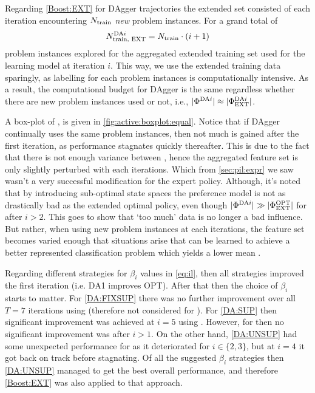 Regarding \ref{Boost:EXT} for DAgger trajectories the extended set 
consisted of each iteration encountering $N_{\text{train}}$ \emph{new} problem 
instances. For a grand total of 
\begin{equation}
N^{\text{DA}i}_{\text{train, EXT}}=N_{\text{train}}\cdot (i+1) 
\end{equation}
problem instances explored for the aggregated extended training set used for 
the learning model at iteration $i$.
This way, we use the extended training data sparingly, as labelling for each 
problem instances is computationally intensive. As a result, the computational 
budget for DAgger is the same regardless whether there are new problem 
instances used or not, i.e., 
$\lvert\Phi^{\text{DA}i}\rvert\approx\lvert\Phi^{\text{DA}i}_{\text{EXT}}\rvert$.

A box-plot of \namerho, is given in \cref{fig:active:boxplot:equal}. 
Notice that if DAgger continually uses the same problem instances, then not 
much is gained after the first iteration, as performance stagnates quickly 
thereafter.
This is due to the fact that there is not enough variance between 
, hence the aggregated feature set  is only 
slightly perturbed with each iterations. 
Which from \cref{sec:pil:expr} we saw wasn't a very successful modification for 
the expert policy. Although, it's noted that by introducing sub-optimal state 
spaces the preference model is not as drastically bad as the extended optimal 
policy, even though $\lvert\Phi^{\text{DA}i}\rvert\gg\lvert\Phi^{\text{OPT}}_{\text{EXT}}\rvert$ for 
 after $i>2$. This goes to show that `too much' data is no longer 
a bad influence. 
But rather, when using new problem instances at each iterations, the feature 
set becomes varied enough that situations arise that can be learned to achieve 
a better represented classification problem which yields a lower mean \namerho.

Regarding different strategies for $\beta_i$ values in \cref{eq:il}, then all 
strategies improved the first iteration (i.e. DA1 improves OPT). After that 
then the choice of $\beta_i$ starts to matter. 
For \ref{DA:FIXSUP} there was no further improvement over all $T=7$ iterations 
using  (therefore not considered for ).
For \ref{DA:SUP} then significant improvement was achieved at $i=5$ using 
.
However, for  then no significant improvement was after $i>1$. 
On the other hand, \ref{DA:UNSUP} had some unexpected performance for 
 as it  deteriorated for $i\in\{2,3\}$, but at $i=4$ it got back on 
track before stagnating.
Of all the suggested $\beta_i$ strategies then \ref{DA:UNSUP} managed to get 
the best overall performance, and therefore \ref{Boost:EXT} was also applied to 
that approach. 

